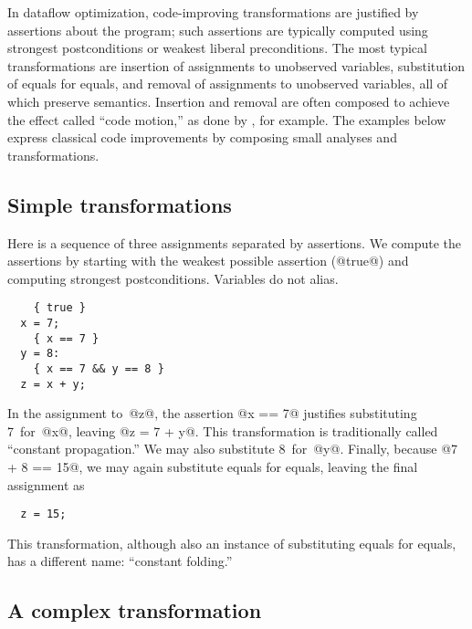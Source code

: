 \documentclass[blockstyle,preprint,nocopyrightspace]{sigplanconf}
\newcommand\seclabel[1]{\label{sec:#1}}
\begin{document}
\seclabel{example:transforms}
\seclabel{example:xforms}

In dataflow optimization, code-improving transformations are justified
by assertions about the program;
such assertions are typically computed using
strongest postconditions or weakest liberal preconditions.
The most typical transformations are
insertion of assignments to unobserved variables,
substitution of equals for equals, 
and
removal of assignments to unobserved variables,
all of which preserve semantics.
Insertion and removal are often composed to achieve the effect called
``code motion,'' as done by \citet{knoop:lazy-code-motion}, for example.
The examples below express classical code
improvements by composing small analyses and transformations.



\subsection{Simple transformations}

\seclabel{constant-propagation}

Here is a sequence of three assignments separated by assertions.
We compute the assertions by starting with the weakest possible
assertion (@true@) and computing strongest postconditions.
{Variables do not alias.}
\begin{verbatim}
    { true }
  x = 7;
    { x == 7 }
  y = 8: 
    { x == 7 && y == 8 }
  z = x + y;
\end{verbatim}
In the assignment to~@z@, the assertion @x == 7@ justifies
substituting 7~for~@x@, leaving @z = 7 + y@.  
This transformation is traditionally called ``constant propagation.''
We may also substitute 8~for~@y@.
Finally, because @7 + 8 == 15@, we may again substitute equals for
equals, leaving the final assignment as
\begin{verbatim}
  z = 15;
\end{verbatim}
This transformation, although also an instance of substituting equals
for equals, has a different name: ``constant folding.''

\subsection{A complex transformation}

\seclabel{induction-var-elim}

\ifpagetuning \enlargethispage{-1\baselineskip} \fi
\end{document}
